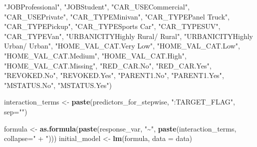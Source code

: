 \documentclass[
]{article}
\newenvironment{Shaded}{\begin{snugshade}}{\end{snugshade}}
\newcommand{\AttributeTok}[1]{\textcolor[rgb]{0.13,0.29,0.53}{#1}}
\newcommand{\FunctionTok}[1]{\textcolor[rgb]{0.13,0.29,0.53}{\textbf{#1}}}
\newcommand{\NormalTok}[1]{#1}
\newcommand{\OtherTok}[1]{\textcolor[rgb]{0.56,0.35,0.01}{#1}}
\newcommand{\StringTok}[1]{\textcolor[rgb]{0.31,0.60,0.02}{#1}}
\begin{document}
\begin{Shaded}
\begin{Highlighting}[]
                  \StringTok{"\textasciigrave{}JOBProfessional\textasciigrave{}"}\NormalTok{, }\StringTok{"\textasciigrave{}JOBStudent\textasciigrave{}"}\NormalTok{, }\StringTok{"\textasciigrave{}CAR\_USECommercial\textasciigrave{}"}\NormalTok{, }
                  \StringTok{"\textasciigrave{}CAR\_USEPrivate\textasciigrave{}"}\NormalTok{, }\StringTok{"\textasciigrave{}CAR\_TYPEMinivan\textasciigrave{}"}\NormalTok{, }\StringTok{"\textasciigrave{}CAR\_TYPEPanel Truck\textasciigrave{}"}\NormalTok{, }
                  \StringTok{"\textasciigrave{}CAR\_TYPEPickup\textasciigrave{}"}\NormalTok{, }\StringTok{"\textasciigrave{}CAR\_TYPESports Car\textasciigrave{}"}\NormalTok{, }\StringTok{"\textasciigrave{}CAR\_TYPESUV\textasciigrave{}"}\NormalTok{, }
                  \StringTok{"\textasciigrave{}CAR\_TYPEVan\textasciigrave{}"}\NormalTok{, }\StringTok{"\textasciigrave{}URBANICITYHighly Rural/ Rural\textasciigrave{}"}\NormalTok{, }\StringTok{"\textasciigrave{}URBANICITYHighly Urban/ Urban\textasciigrave{}"}\NormalTok{, }
                  \StringTok{"\textasciigrave{}HOME\_VAL\_CAT.Very Low\textasciigrave{}"}\NormalTok{, }\StringTok{"\textasciigrave{}HOME\_VAL\_CAT.Low\textasciigrave{}"}\NormalTok{, }\StringTok{"\textasciigrave{}HOME\_VAL\_CAT.Medium\textasciigrave{}"}\NormalTok{, }
                  \StringTok{"\textasciigrave{}HOME\_VAL\_CAT.High\textasciigrave{}"}\NormalTok{, }\StringTok{"\textasciigrave{}HOME\_VAL\_CAT.Missing\textasciigrave{}"}\NormalTok{, }\StringTok{"\textasciigrave{}RED\_CAR.No\textasciigrave{}"}\NormalTok{, }
                  \StringTok{"\textasciigrave{}RED\_CAR.Yes\textasciigrave{}"}\NormalTok{, }\StringTok{"\textasciigrave{}REVOKED.No\textasciigrave{}"}\NormalTok{, }\StringTok{"\textasciigrave{}REVOKED.Yes\textasciigrave{}"}\NormalTok{, }
                  \StringTok{"\textasciigrave{}PARENT1.No\textasciigrave{}"}\NormalTok{, }\StringTok{"\textasciigrave{}PARENT1.Yes\textasciigrave{}"}\NormalTok{, }\StringTok{"\textasciigrave{}MSTATUS.No\textasciigrave{}"}\NormalTok{, }\StringTok{"\textasciigrave{}MSTATUS.Yes\textasciigrave{}"}\NormalTok{)}

\NormalTok{  interaction\_terms }\OtherTok{\textless{}{-}} \FunctionTok{paste}\NormalTok{(predictors\_for\_stepwise, }\StringTok{":TARGET\_FLAG"}\NormalTok{, }\AttributeTok{sep=}\StringTok{""}\NormalTok{)}

\NormalTok{  formula }\OtherTok{\textless{}{-}} \FunctionTok{as.formula}\NormalTok{(}\FunctionTok{paste}\NormalTok{(response\_var, }\StringTok{"\textasciitilde{}"}\NormalTok{, }\FunctionTok{paste}\NormalTok{(interaction\_terms, }\AttributeTok{collapse=}\StringTok{" + "}\NormalTok{)))}
\NormalTok{  initial\_model }\OtherTok{\textless{}{-}} \FunctionTok{lm}\NormalTok{(formula, }\AttributeTok{data =}\NormalTok{ data)}


\end{Highlighting}
\end{Shaded}
\end{document}
